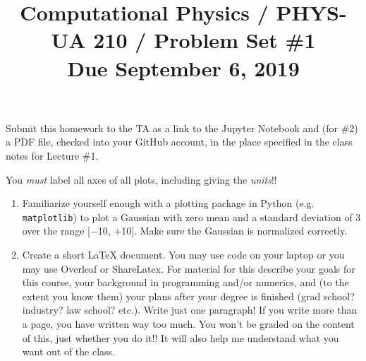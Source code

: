 \documentclass[11pt, preprint]{aastex}
\begin{document}
\title{\bf Computational Physics / PHYS-UA 210 / Problem Set \#1
\\ Due September 6, 2019 }

Submit this homework to the TA as a link to the Jupyter Notebook and
(for \#2) a PDF file, checked into your GitHub account, in the place
specified in the class notes for Lecture \#1.

You {\it must} label all axes of all plots, including giving the {\it
  units}!!

\begin{enumerate}

  \item Familiarize yourself enough with a plotting package in Python
    (e.g. {\tt matplotlib}) to plot a Gaussian with zero mean and a
    standard deviation of 3 over the range [$-$10, $+$10]. Make sure
    the Gaussian is normalized correctly.

  \item Create a short LaTeX document. You may use code on your laptop
    or you may use Overleaf or ShareLatex. For material for this
    describe your goals for this course, your background in
    programming and/or numerics, and (to the extent you know them)
    your plans after your degree is finished (grad school? industry?
    law school? etc.). Write just one paragraph! If you write more
    than a page, you have written way too much. You won't be graded on
    the content of this, just whether you do it!! It will also help me
    understand what you want out of the class.

\end{enumerate}
\end{document}
